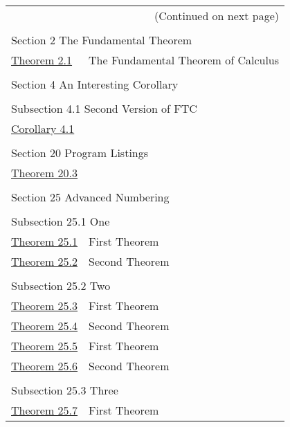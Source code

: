 \documentclass[10pt,]{article}
\DeclareRobustCommand{\acronymintitle}[1]{\texorpdfstring{#1}{#1}}
\theoremstyle{plain}
\theoremstyle{definition}
\theoremstyle{definition}
\theoremstyle{definition}
\theoremstyle{definition}
\theoremstyle{definition}
\theoremstyle{definition}
\numberwithin{equation}{section}
\begin{document}
\begin{longtable}[l]{ll}
\endfirsthead
\endhead
\multicolumn{2}{r}{(Continued on next page)}\\
\endfoot
\endlastfoot
\multicolumn{2}{l}{\null}\\[1.5ex] \multicolumn{2}{l}{\large Section 2 The Fundamental Theorem}\\[0.5ex]
\hyperref[theorem-FTC]{Theorem 2.1}& The Fundamental Theorem of Calculus\\
\multicolumn{2}{l}{\null}\\[1.5ex] \multicolumn{2}{l}{\large Section 4 An Interesting Corollary}\\[0.5ex]
\multicolumn{2}{l}{\null}\\[1.5ex] \multicolumn{2}{l}{\large Subsection 4.1 Second Version of \acronymintitle{FTC}}\\[0.5ex]
\hyperref[corollary-FTC-derivative]{Corollary 4.1}& \\
\multicolumn{2}{l}{\null}\\[1.5ex] \multicolumn{2}{l}{\large Section 20 Program Listings}\\[0.5ex]
\hyperref[theorem-2]{Theorem 20.3}& \\
\multicolumn{2}{l}{\null}\\[1.5ex] \multicolumn{2}{l}{\large Section 25 Advanced Numbering}\\[0.5ex]
\multicolumn{2}{l}{\null}\\[1.5ex] \multicolumn{2}{l}{\large Subsection 25.1 One}\\[0.5ex]
\hyperref[theorem-number-01]{Theorem 25.1}& First Theorem\\
\hyperref[theorem-number-02]{Theorem 25.2}& Second Theorem\\
\multicolumn{2}{l}{\null}\\[1.5ex] \multicolumn{2}{l}{\large Subsection 25.2 Two}\\[0.5ex]
\hyperref[theorem-number-03]{Theorem 25.3}& First Theorem\\
\hyperref[theorem-number-04]{Theorem 25.4}& Second Theorem\\
\hyperref[theorem-number-05]{Theorem 25.5}& First Theorem\\
\hyperref[theorem-number-06]{Theorem 25.6}& Second Theorem\\
\multicolumn{2}{l}{\null}\\[1.5ex] \multicolumn{2}{l}{\large Subsection 25.3 Three}\\[0.5ex]
\hyperref[theorem-number-07]{Theorem 25.7}& First Theorem\\

\end{longtable}
\end{document}
